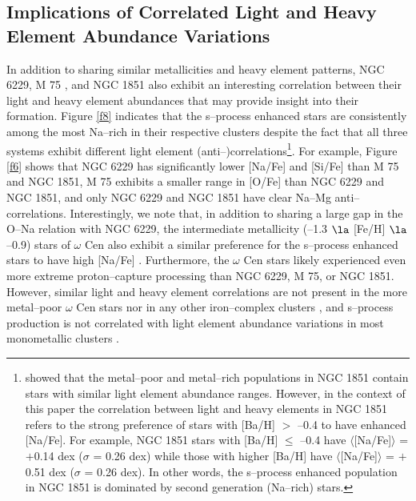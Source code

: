 \documentclass[12pt,preprint]{emulateapj}
\begin{document}
\subsection{Implications of Correlated Light and Heavy Element Abundance 
Variations}

In addition to sharing similar metallicities and heavy element patterns, 
NGC 6229, M 75 \citep{Kacharov13}, and NGC 1851 \citep{Yong08,Yong09,
Carretta11,Gratton12c,Carretta14a,Simpson17} also exhibit an interesting 
correlation between their light and heavy element abundances that may provide
insight into their formation.  Figure \ref{f8} indicates that the s--process
enhanced stars are consistently among the most Na--rich in their 
respective clusters despite the fact that all three systems exhibit different
light element (anti--)correlations\footnote{\citet{Carretta11} showed that the
metal--poor and metal--rich populations in NGC 1851 contain stars with similar 
light element abundance ranges.  However, in the context of this paper the 
correlation between light and heavy elements in NGC 1851 refers to the strong 
preference of stars with [Ba/H] $>$ --0.4 to have enhanced [Na/Fe].  For 
example, NGC 1851 stars with [Ba/H] $\leq$ --0.4 have $\langle$[Na/Fe]$\rangle$
= $+$0.14 dex ($\sigma$ = 0.26 dex) while those with higher [Ba/H] have 
$\langle$[Na/Fe]$\rangle$ = $+$0.51 dex ($\sigma$ = 0.26 dex).  In other words,
the s--process enhanced population in NGC 1851 is dominated by second 
generation (Na--rich) stars.}.  For example, Figure \ref{f6} shows that NGC 
6229 has significantly lower [Na/Fe] and [Si/Fe] than M 75 and NGC 1851, M 75 
exhibits a smaller range in [O/Fe] than NGC 6229 and NGC 1851, and only 
NGC 6229 and NGC 1851 have clear Na--Mg anti--correlations.  Interestingly, we 
note that, in addition to sharing a large gap in the O--Na relation with NGC 
6229, the intermediate metallicity (--1.3 $\la$ [Fe/H] $\la$ --0.9) stars of 
$\omega$ Cen also exhibit a similar preference for the s--process enhanced 
stars to have high [Na/Fe] \citep{Johnson10,Marino11a}.  Furthermore, the 
$\omega$ Cen stars likely experienced even more extreme proton--capture 
processing than NGC 6229, M 75, or NGC 1851.  However, similar light and heavy 
element correlations are not present in the more metal--poor $\omega$ Cen stars
nor in any other iron--complex clusters \citep{Marino09,Yong14,Marino15,
Roederer16,Johnson17a}, and s--process production is not correlated with light 
element abundance variations in most monometallic clusters 
\citep[e.g.,][]{D'Orazi10}.  
\end{document}
